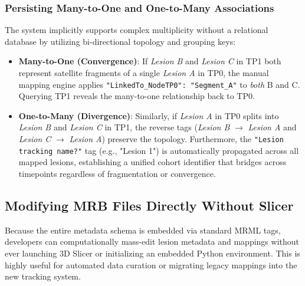 \documentclass[a4paper,10pt]{article}
\begin{document}
\subsubsection*{Persisting Many-to-One and One-to-Many Associations}
The system implicitly supports complex multiplicity without a relational database by utilizing bi-directional topology and grouping keys:
\begin{itemize}
    \item \textbf{Many-to-One (Convergence)}: If \textit{Lesion B} and \textit{Lesion C} in TP1 both represent satellite fragments of a single \textit{Lesion A} in TP0, the manual mapping engine applies \texttt{"LinkedTo\_NodeTP0": "Segment\_A"} to \textit{both} B and C. Querying TP1 reveals the many-to-one relationship back to TP0.
    \item \textbf{One-to-Many (Divergence)}: Similarly, if \textit{Lesion A} in TP0 splits into \textit{Lesion B} and \textit{Lesion C} in TP1, the reverse tags (\textit{Lesion B} $\rightarrow$ \textit{Lesion A} and \textit{Lesion C} $\rightarrow$ \textit{Lesion A}) preserve the topology. Furthermore, the \texttt{"Lesion tracking name?"} tag (e.g., "Lesion 1") is automatically propagated across all mapped lesions, establishing a unified cohort identifier that bridges across timepoints regardless of fragmentation or convergence.
\end{itemize}

\subsection{Modifying MRB Files Directly Without Slicer}
Because the entire metadata schema is embedded via standard MRML tags, developers can computationally mass-edit lesion metadata and mappings without ever launching 3D Slicer or initializing an embedded Python environment. This is highly useful for automated data curation or migrating legacy mappings into the new tracking system.
\end{document}
